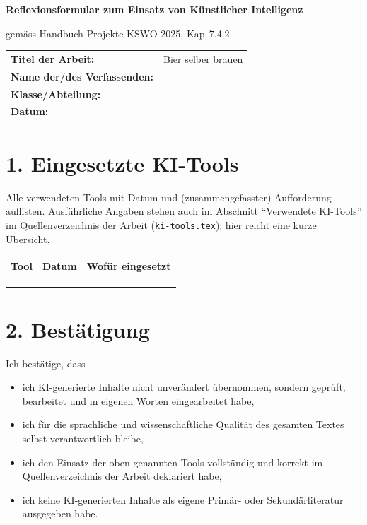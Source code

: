 \documentclass[11pt,a4paper]{article}
\begin{document}
\begin{center}
  {\LARGE\bfseries Reflexionsformular zum Einsatz von Künstlicher
  Intelligenz\par}
  \vspace{0.3em}
  {\large gemäss Handbuch Projekte KSWO 2025, Kap.\,7.4.2\par}
\end{center}

\vspace{1.5em}

\noindent
\begin{tabular}{@{}ll}
  \textbf{Titel der Arbeit:} & Bier selber brauen \\[0.3em]
  \textbf{Name der/des Verfassenden:} & \hrulefill \\[0.3em]
  \textbf{Klasse/Abteilung:} & \hrulefill \\[0.3em]
  \textbf{Datum:} & \hrulefill \\
\end{tabular}

\vspace{1.5em}

\section*{1. Eingesetzte KI-Tools}

Alle verwendeten Tools mit Datum und (zusammengefasster) Aufforderung
auflisten. Ausführliche Angaben stehen auch im Abschnitt
\enquote{Verwendete KI-Tools} im Quellenverzeichnis der Arbeit
(\texttt{ki-tools.tex}); hier reicht eine kurze Übersicht.

\begin{center}
\begin{tabular}{p{3.2cm}p{2.5cm}p{7.5cm}}
  \textbf{Tool} & \textbf{Datum} & \textbf{Wofür eingesetzt} \\
  \hline
  & & \\[2.5em]
  & & \\[2.5em]
  & & \\[2.5em]
\end{tabular}
\end{center}

\section*{2. Bestätigung}

\noindent Ich bestätige, dass
\begin{itemize}[leftmargin=1.2em]
  \item ich KI-generierte Inhalte nicht unverändert übernommen, sondern
    geprüft, bearbeitet und in eigenen Worten eingearbeitet habe,
  \item ich für die sprachliche und wissenschaftliche Qualität des
    gesamten Textes selbst verantwortlich bleibe,
  \item ich den Einsatz der oben genannten Tools vollständig und korrekt
    im Quellenverzeichnis der Arbeit deklariert habe,
  \item ich keine KI-generierten Inhalte als eigene Primär- oder
    Sekundärliteratur ausgegeben habe.
\end{itemize}
\end{document}

